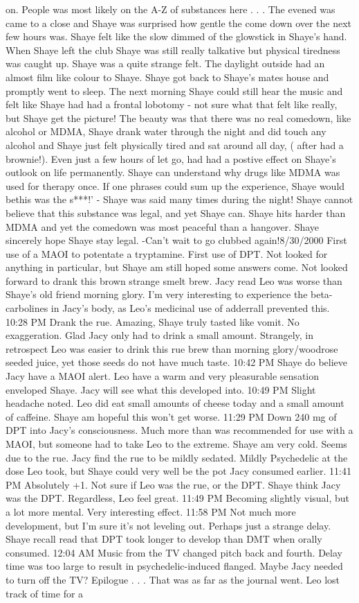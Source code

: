 \documentclass[12pt]{book}
\begin{document}
on. People was most likely on the A-Z of substances here . . .  The evened was came to a close and Shaye was surprised how gentle the come down over the next few hours was. Shaye felt like the slow dimmed of the glowstick in Shaye's hand. When Shaye left the club Shaye was still really talkative but physical tiredness was caught up. Shaye was a quite strange felt. The daylight outside had an almost film like colour to Shaye. Shaye got back to Shaye's mates house and promptly went to sleep. The next morning Shaye could still hear the music and felt like Shaye had had a frontal lobotomy - not sure what that felt like really, but Shaye get the picture! The beauty was that there was no real comedown, like alcohol or MDMA, Shaye drank water through the night and did touch any alcohol and Shaye just felt physically tired and sat around all day, ( after had a brownie!). Even just a few hours of let go, had had a postive effect on Shaye's outlook on life permanently. Shaye can understand why drugs like MDMA was used for therapy once. If one phrases could sum up the experience, Shaye would bethis was the s***!' - Shaye was said many times during the night! Shaye cannot believe that this substance was legal, and yet Shaye can. Shaye hits harder than MDMA and yet the comedown was most peaceful than a hangover. Shaye sincerely hope Shaye stay legal. -Can't wait to go clubbed again!8/30/2000 First use of a MAOI to potentate a tryptamine. First use of DPT. Not looked for anything in particular, but Shaye am still hoped some answers come. Not looked forward to drank this brown strange smelt brew. Jacy read Leo was worse than Shaye's old friend morning glory. I'm very interesting to experience the beta-carbolines in Jacy's body, as Leo's medicinal use of adderrall prevented this. 10:28 PM Drank the rue. Amazing, Shaye truly tasted like vomit. No exaggeration. Glad Jacy only had to drink a small amount. Strangely, in retrospect Leo was easier to drink this rue brew than morning glory/woodrose seeded juice, yet those seeds do not have much taste. 10:42 PM Shaye do believe Jacy have a MAOI alert. Leo have a warm and very pleasurable sensation enveloped Shaye. Jacy will see what this developed into. 10:49 PM Slight headache noted. Leo did eat small amounts of cheese today and a small amount of caffeine. Shaye am hopeful this won't get worse. 11:29 PM Down 240 mg of DPT into Jacy's consciousness. Much more than was recommended for use with a MAOI, but someone had to take Leo to the extreme. Shaye am very cold. Seems due to the rue. Jacy find the rue to be mildly sedated. Mildly Psychedelic at the dose Leo took, but Shaye could very well be the pot Jacy consumed earlier. 11:41 PM Absolutely +1. Not sure if Leo was the rue, or the DPT. Shaye think Jacy was the DPT. Regardless, Leo feel great. 11:49 PM Becoming slightly visual, but a lot more mental. Very interesting effect. 11:58 PM Not much more development, but I'm sure it's not leveling out. Perhaps just a strange delay. Shaye recall read that DPT took longer to develop than DMT when orally consumed. 12:04 AM Music from the TV changed pitch back and fourth. Delay time was too large to result in psychedelic-induced flanged. Maybe Jacy needed to turn off the TV? Epilogue . . .  That was as far as the journal went. Leo lost track of time for a 
\end{document}
